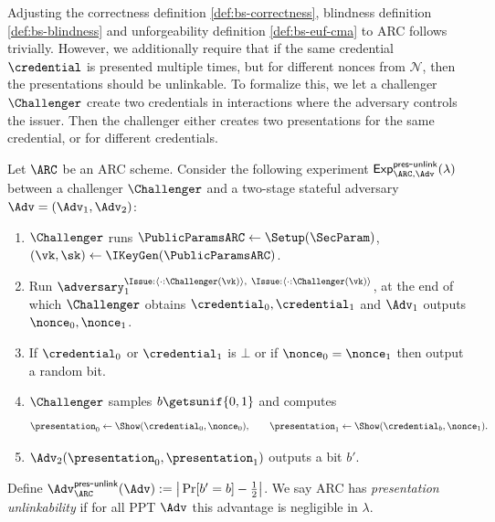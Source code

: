 Adjusting the correctness definition \ref{def:bs-correctness}, blindness definition \ref{def:bs-blindness} and unforgeability definition \ref{def:bs-euf-cma} to ARC follows trivially. However, we additionally require that if the same credential $\credential$ is presented multiple times, but for different nonces from $\mathcal{N}$, then the presentations should be unlinkable. To formalize this, we let a challenger $\Challenger$ create two credentials in interactions where the adversary controls the issuer. Then the challenger either creates two presentations for the same credential, or for different credentials.

\begin{definition}\label{def:pres-unlink}
Let $\ARC$ be an ARC scheme. Consider the following experiment
$\mathsf{Exp}^{\mathsf{pres\mbox{-}unlink}}_{\ARC,\Adv}(\lambda)$ between a challenger $\Challenger$ and a two-stage stateful adversary $\Adv=(\Adv_1,\Adv_2)$:
\begin{enumerate}[leftmargin=1.25em]
  \item $\Challenger$ runs $\PublicParamsARC\gets \Setup(\SecParam)$, $(\vk,\sk)\gets \IKeyGen(\PublicParamsARC)$. 
\item Run $\adversary_1^{\Issue:\langle \cdot: \Challenger(\vk)\rangle ,~ \Issue:\langle \cdot: \Challenger(\vk)\rangle }$, at the end of which $\Challenger$ obtains $\credential_0,\credential_1$ and $\Adv_1$ outputs $\nonce_0,\nonce_1$.
\item If $\credential_0$ or $\credential_1$ is $\bot$ or if $\nonce_0=\nonce_1$ then output a random bit.

  \item $\Challenger$ samples $b\getsunif\{0,1\}$ and computes
  \[
    \presentation_0 \leftarrow \Show(\credential_0,\nonce_0),\qquad
    \presentation_1 \leftarrow \Show(\credential_b,\nonce_1).
  \]
  \item $\Adv_2(\presentation_0,\presentation_1)$ outputs a bit $b'$.
\end{enumerate}
Define $\Adv^{\mathsf{pres\mbox{-}unlink}}_{\ARC}(\Adv) := \big| \Pr[b'=b]-\tfrac12 \big|$.
We say ARC has \emph{presentation unlinkability} if for all PPT $\Adv$ this advantage is negligible in $\lambda$.

\end{definition}


